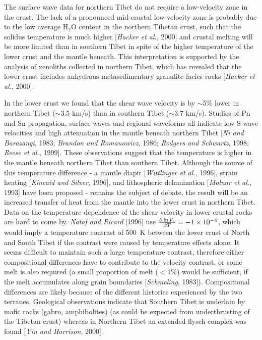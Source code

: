 \documentclass[12pt]{article}
\newcommand{\de}[2]{ {{\partial #1}\over{\partial #2}} }
\begin{document}
The surface wave data for northern Tibet do not require a low-velocity zone in the crust.  The lack of a
pronounced mid-crustal low-velocity zone is probably due to the low average H$_2$O content in the northern
Tibetan crust, such that the solidus temperature is much higher [{\it Hacker et al.}, 2000] and crustal
melting will be more limited than in southern Tibet in spite of the higher temperature of the lower crust
and the mantle beneath.  This interpretation is supported by the analysis of xenoliths collected in
northern Tibet, which has revealed that the lower crust includes anhydrous metasedimentary
granulite-facies rocks [{\it Hacker et al.}, 2000].

In the lower crust we found that the shear wave velocity
 is by $\sim$5\% lower in northern Tibet ($\sim$3.5 km/s) than in
southern Tibet ($\sim$3.7 km/s).
 Studies of Pn and Sn propagation, surface waves and regional waveforms all
indicate low S wave velocities and high attenuation in the mantle beneath northern Tibet [{\it Ni and
Barazangi}, 1983; {\it Brandon and Romanowicz}, 1986; {\it Rodgers and Schwartz}, 1998; {\it Reese et al.},
1999].  These observations suggest that the temperature is higher in the mantle beneath northern Tibet than
southern Tibet.  Although the source of this temperature difference - a mantle diapir [{\it Wittlinger et al.},
1996], strain heating [{\it Kincaid and Silver}, 1996], and lithospheric delamination [{\it Molnar et al.},
1993] have been proposed - remains the subject of debate, the result will be an increased transfer of heat from the mantle
into the lower crust in northern Tibet.
Data on the temperature dependence of the shear velocity in
lower-crustal
rocks are hard to come by. {\it Nataf and Ricard} [1996] use
$\de{\ln V_s}{T}=-1\times 10^{-4}$, which would imply a temperature
contrast of 500~K between the lower crust of North and South Tibet if
the contrast were caused by temperature effects alone.
It seems difficult to maintain such a large temperature contrast,
therefore either compositional differences have to contribute to the
velocity contrast,  or  some melt is also required (a small proportion of melt ($<1$\%)
would be sufficient, if the melt accumulates along grain boundaries
[{\it Schmeling}, 1983]).
Compositional differences are likely because
of the different histories experienced by the two terranes.
Geological observations indicate that Southern Tibet is underlain by
mafic rocks (gabro, amphibolites) (as could be expected from
underthrusting of the Tibetan crust) whereas in Northern Tibet an
extended flysch complex was found [{\it Yin and Harrison}, 2000].
\end{document}
